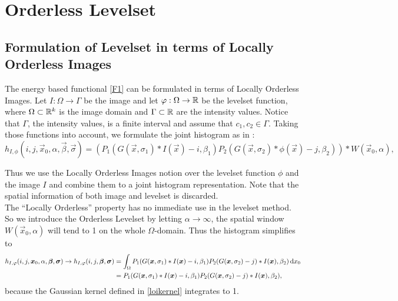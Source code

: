 
\chapter{Orderless Levelset}\label{chapter:OL}
\section{Formulation of Levelset in terms of Locally Orderless Images}\label{section:OLform}
The energy based functional \eqref{F1} can be formulated in terms of Locally Orderless Images. Let $I:\Omega\to \Gamma$ be the image and let $\varphi:\Omega\to\mathbb R$ be the levelset function, where $\Omega\subset \mathbb R^k$ is the image domain and $\Gamma\subset\mathbb R$ are the intensity values. Notice that $\Gamma$, the intensity values, is a finite interval and assume that $c_1,c_2\in \Gamma$. Taking those functions into account, we formulate the joint histogram as in \cite{dar.11}:
\begin{equation}
  h_{I,\phi}(i,j,\vec{x}_0,\alpha,\vec{\beta},\vec{\sigma}) = (P_1(G(\vec{x},\sigma_1)*I(\vec{x})-i,\beta_1)P_2(G(\vec{x},\sigma_2)*\phi(\vec{x})-j,\beta_2))*W(\vec{x}_0,\alpha),
\end{equation}

Thus we use the Locally Orderless Images notion over the levelset function $\phi$ and the image $I$ and combine them to a joint histogram representation. Note that the spatial information of both image and levelset is discarded.\\
The ``Locally Orderless'' property has no immediate use in the levelset method. So we introduce the Orderless Levelset by letting $\alpha\to \infty$, the spatial window $W(\vec{x}_0,\alpha)$ will tend to 1 on the whole $\Omega$-domain. Thus the histogram simplifies to
\begin{equation}
  \begin{split}
    h_{I,\varphi}(i,j,\boldsymbol{x} _0,\alpha,\boldsymbol{\beta} ,\boldsymbol{\sigma} )\to h_{I,\varphi}(i,j,\boldsymbol{\beta} ,\boldsymbol{\sigma} ) &= \int _\Omega P_1(G(\boldsymbol{x} ,\sigma_1)*I(\boldsymbol{x} )-i,\beta_1)P_2(G(\boldsymbol{x} ,\sigma_2)-j)*I(\boldsymbol{x} ),\beta_2)\,{\rm d} x_0\\
    &= P_1(G(\boldsymbol{x} ,\sigma_1)*I(\boldsymbol{x} )-i,\beta_1)P_2(G(\boldsymbol{x} ,\sigma_2)-j)*I(\boldsymbol{x} ),\beta_2),
  \end{split}
\end{equation}
because the Gaussian kernel defined in \eqref{loikernel} integrates to 1.

